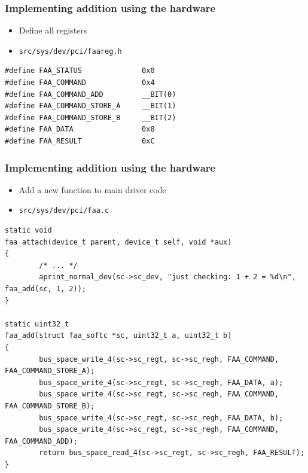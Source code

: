\documentclass[dvipsnames,table]{beamer}
\begin{document}
\begin{frame}[fragile]
\frametitle{Implementing addition using the hardware}
\begin{itemize}
	\item Define all registers
	\item {\tt src/sys/dev/pci/faareg.h}
\end{itemize}
\begin{lstlisting}
#define FAA_STATUS              0x0
#define FAA_COMMAND             0x4
#define FAA_COMMAND_ADD         __BIT(0)        
#define FAA_COMMAND_STORE_A     __BIT(1)
#define FAA_COMMAND_STORE_B     __BIT(2)
#define FAA_DATA                0x8
#define FAA_RESULT              0xC
\end{lstlisting}
\end{frame}

\begin{frame}[fragile]
\frametitle{Implementing addition using the hardware}
\begin{itemize}
	\item Add a new function to main driver code
	\item {\tt src/sys/dev/pci/faa.c}
\end{itemize}
\begin{lstlisting}
static void
faa_attach(device_t parent, device_t self, void *aux)
{
        /* ... */
        aprint_normal_dev(sc->sc_dev, "just checking: 1 + 2 = %d\n", faa_add(sc, 1, 2));
}

static uint32_t
faa_add(struct faa_softc *sc, uint32_t a, uint32_t b)
{
        bus_space_write_4(sc->sc_regt, sc->sc_regh, FAA_COMMAND, FAA_COMMAND_STORE_A);
        bus_space_write_4(sc->sc_regt, sc->sc_regh, FAA_DATA, a);
        bus_space_write_4(sc->sc_regt, sc->sc_regh, FAA_COMMAND, FAA_COMMAND_STORE_B);
        bus_space_write_4(sc->sc_regt, sc->sc_regh, FAA_DATA, b);
        bus_space_write_4(sc->sc_regt, sc->sc_regh, FAA_COMMAND, FAA_COMMAND_ADD);
        return bus_space_read_4(sc->sc_regt, sc->sc_regh, FAA_RESULT);
}
\end{lstlisting}
\end{frame}
\end{document}
